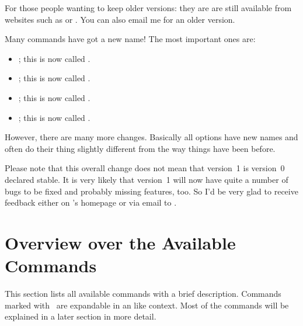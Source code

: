 \documentclass[load-preamble+,babel-options={ngerman,british,american}]{cnltx-doc}
\begin{document}
For those people wanting to keep older versions: they are are still available
from websites such as  or
.  You can also email me for an
older version.

Many commands have got a new name! The most important ones are:
\begin{itemize}
  \item {}; this is now called .
  \item {}; this is now called .
  \item {}; this is now called .
  \item {}; this is now called .
\end{itemize}
However, there are many more changes.  Basically all options have new names
and often do their thing slightly different from the way things have been
before.

Please note that this overall change does not mean that version~1 is version~0
declared stable.  It is very likely that version~1 will now have quite a
number of bugs to be fixed and probably missing features, too.  So I'd be very
glad to receive feedback either on \chemnum's homepage
 or via email to
.

\section{Overview over the Available Commands}\label{sec:overv-over-avail}

This section lists all available commands with a brief description.  Commands
marked with \expandablesymbol\ are expandable in an  like context.
Most of the commands will be explained in a later section in more detail.
\end{document}
